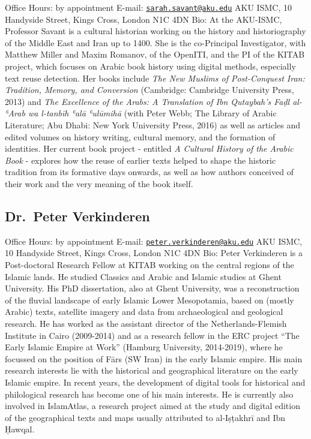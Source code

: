 \documentclass[
]{book}
\begin{document}
Office Hours: by appointment
E-mail: \href{mailto:sarah.savant@aku.edu}{\nolinkurl{sarah.savant@aku.edu}}
AKU ISMC, 10 Handyside Street, Kings Cross, London N1C 4DN
Bio: At the AKU-ISMC, Professor Savant is a cultural historian working on the history and historiography of the Middle East and Iran up to 1400. She is the co-Principal Investigator, with Matthew Miller and Maxim Romanov, of the OpenITI, and the PI of the KITAB project, which focuses on Arabic book history using digital methods, especially text reuse detection. Her books include \emph{The New Muslims of Post-Conquest Iran: Tradition, Memory, and Conversion} (Cambridge: Cambridge University Press, 2013) and \emph{The Excellence of the Arabs: A Translation of Ibn Qutaybah's Faḍl al-ʿArab wa l-tanbīh ʿalā ʿulūmihā} (with Peter Webb; The Library of Arabic Literature; Abu Dhabi: New York University Press, 2016) as well as articles and edited volumes on history writing, cultural memory, and the formation of identities. Her current book project - entitled \emph{A Cultural History of the Arabic Book} - explores how the reuse of earlier texts helped to shape the historic tradition from its formative days onwards, as well as how authors conceived of their work and the very meaning of the book itself.

\hypertarget{dr.-peter-verkinderen}{%
\subsection{Dr.~Peter Verkinderen}\label{dr.-peter-verkinderen}}

Office Hours: by appointment
E-mail: \href{mailto:peter.verkinderen@aku.edu}{\nolinkurl{peter.verkinderen@aku.edu}}
AKU ISMC, 10 Handyside Street, Kings Cross, London N1C 4DN
Bio: Peter Verkinderen is a Post-doctoral Research Fellow at KITAB working on the central regions of the Islamic lands. He studied Classics and Arabic and Islamic studies at Ghent University. His PhD dissertation, also at Ghent University, was a reconstruction of the fluvial landscape of early Islamic Lower Mesopotamia, based on (mostly Arabic) texts, satellite imagery and data from archaeological and geological research. He has worked as the assistant director of the Netherlands-Flemish Institute in Cairo (2009-2014) and as a research fellow in the ERC project ``The Early Islamic Empire at Work'' (Hamburg University, 2014-2019), where he focussed on the position of Fārs (SW Iran) in the early Islamic empire. His main research interests lie with the historical and geographical literature on the early Islamic empire. In recent years, the development of digital tools for historical and philological research has become one of his main interests. He is currently also involved in IslamAtlas, a research project aimed at the study and digital edition of the geographical texts and maps usually attributed to al-Iṣṭakhrī and Ibn Ḥawqal.
\end{document}
